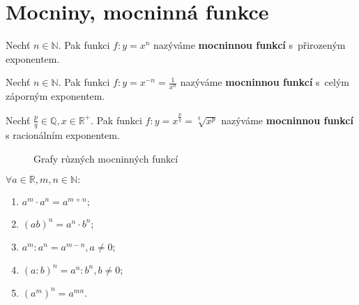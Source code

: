 \section{Mocniny, mocninná funkce}

\begin{definition}
    Nechť $n\in \mathbb N.$ Pak funkci $f: y=x^n$ nazýváme \textbf{mocninnou funkcí}
    s~přirozeným exponentem.
\end{definition}

\begin{definition}
    Nechť $n\in \mathbb N.$ Pak funkci $f: y=x^{-n}=\frac{1}{x^n}$ nazýváme
    \textbf{mocninnou funkcí} s~celým záporným exponentem.
\end{definition}

\begin{definition}
    Nechť $\frac{p}{q}\in \mathbb Q, x \in \mathbb R^+.$ Pak funkci $f: y=
    x^{\frac{p}{q}}=\sqrt[q]{x^p}$ nazýváme \textbf{mocninnou funkcí}
    s racionálním exponentem.
\end{definition}


\begin{figure}[ht!]
  \centering
  \caption{Grafy různých mocninných funkcí}
\end{figure}

\begin{veta}
    $\forall a \in \mathbb R, m,n \in \mathbb N:$
    \begin{enumerate}[$i.$]
        \item $a^m\cdot a^n=a^{m+n};$
       	\item $(ab)^n = a^n\cdot b^n;$
       	\item $a^m : a^n = a^{m-n}, a \ne 0;$
       	\item $(a : b)^n = a^n : b^n, b \ne 0;$
       	\item $\left ( a^m \right )^n = a^{mn}.$
    \end{enumerate}
\end{veta}

